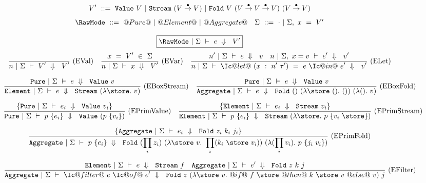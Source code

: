 
\begin{figure*}
$$
V'~     ::=~\VValue{V}
        ~|~\VStream {(V \stackrel{\bullet}{\to} V)}
        ~|~\VFold{V}{(V \stackrel{\bullet}{\to} V \stackrel{\bullet}{\to} V)}
                    {(V \stackrel{\bullet}{\to} V)}
$$
$$
\begin{array}{ll}

\RawMode~::=~@Pure@~|~@Element@~|~@Aggregate@

&

\Sigma~::=~\cdot~|~\Sigma,~x~=~V'

\end{array}
$$

  \footnotesize


$$
\boxed{\SourceStepX{\RawMode}{\Sigma}{e}{V'}}
$$
$$
\ruleAx
{
    \SourceStepX{n}{\Sigma}{V'}{V'}
}{EVal}
\ruleIN
{
    x~=~V'~\in~\Sigma
}
{
    \SourceStepX{n}{\Sigma}{x}{V'}
}{EVar}
\ruleIN
{
  \SourceStepX{n'}{\Sigma}{e}{v}
  \quad
  \SourceStepX{n}{\Sigma,~x=v}{e'}{v'}
}
{
  \SourceStepX
    {n}
    {\Sigma}
    {\Ic@let@~(x~:~n'~\tau')~=~e~\Ic@in@~e'}
    {v'}
}{ELet}
$$

$$
\ruleIN
{
    \SourceStepXP{\Sigma}{e}{\VValue{v}}
}
{
    \SourceStepXE{\Sigma}{e}{\VStream{(\lam{\store} v)}}
}{EBoxStream}
\ruleIN
{
    \SourceStepXP{\Sigma}{e}{\VValue{v}}
}
{
    \SourceStepXA{\Sigma}{e}{\VFold{()}{(\lam{\store~()} ())}{(\lam{()} v)}}
}{EBoxFold}
$$

$$
\ruleIN
{
  \{ \SourceStepXP{\Sigma}{e_i}{\VValue{v_i}} \}
}
{
  \SourceStepXP
    {\Sigma}
    {p~\{ e_i \} }
    {\VValue{(p~\{v_i\})}}
}{EPrimValue}
\ruleIN
{
  \{ \SourceStepXE{\Sigma}{e_i}{\VStream{v_i}} \}
}
{
  \SourceStepXE
    {\Sigma}
    {p~\{ e_i \} }
    {\VStream{(\lam{\store} p~\{v_i~\store\})}}
}{EPrimStream}
$$

$$
\ruleIN
{
  \{ \SourceStepXA{\Sigma}{e_i}{\VFold{z_i}{k_i}{j_i}} \}
}
{
  \SourceStepXA{\Sigma}
    {p~\{ e_i \} }
    { \VFold
      {(\prod_i z_i)}
      {(\lam{\store~v}
        \prod_i (k_i~\store~v_i))}
      {(\lam{(\prod_i v_i)}
        p~\{j_i~v_i\})}}
}{EPrimFold}
$$

$$
\ruleIN
{
  \SourceStepXE{\Sigma}{e}{\VStream{f}}
  \quad
  \SourceStepXA{\Sigma}{e'}{\VFold{z}{k}{j}}
}
{
  \SourceStepXA{\Sigma}
    {\Ic@filter@~e~\Ic@of@~e'}
    {\VFold
      {z}
      {(\lam{\store~v}
         @if@~f~\store~@then@~k~\store~v~@else@~v)}
      {j}}
}{EFilter}
$$


\end{figure*}

